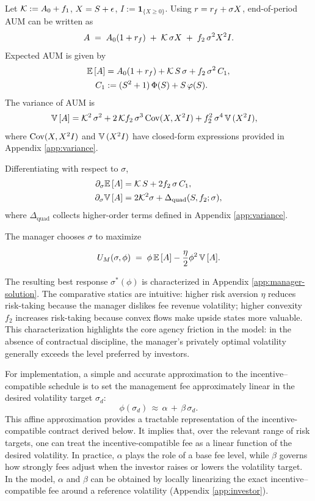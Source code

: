 Let \(\mathcal{K}:=A_0+f_1\), \(X=S+\epsilon\),
\(I:=\mathbf{1}_{\{X\ge 0\}}\). Using \(r=r_f+\sigma X\), end-of-period
AUM can be written as \begin{equation}
A \;=\; A_0(1+r_f) \;+\; \mathcal{K}\,\sigma X \;+\; f_2\,\sigma^2 X^2 I.
\end{equation} Expected AUM is given by \begin{align}
{\mathbb{E}}\,[A] &= A_0(1+r_f) + \mathcal{K}\,S\,\sigma + f_2\,\sigma^2\,C_1, \label{eq:EA}\\
C_1 &:= (S^2+1)\,\Phi(S) + S\,\varphi(S). \label{eq:C1}
\end{align} The variance of AUM is \begin{align}
{\mathbb{V}}\,[A] &= \mathcal{K}^2\,\sigma^2 + 2\,\mathcal{K} f_2\,\sigma^3\,{\mathrm{Cov}}(X, X^2 I) + f_2^2\,\sigma^4\,{\mathbb{V}}\,(X^2 I), \label{eq:VarA}
\end{align} where \({\mathrm{Cov}}(X, X^2 I)\) and \({\mathbb{V}}\,(X^2 I)\) have closed-form
expressions provided in Appendix \ref{app:variance}.

Differentiating with respect to \(\sigma\), \begin{align}
\partial_\sigma {\mathbb{E}}\,[A] &= \mathcal{K}\,S + 2 f_2\,\sigma\,C_1, \label{eq:dEA}\\
\partial_\sigma {\mathbb{V}}\,[A] &= 2\mathcal{K}^2\sigma + \Delta_{\text{quad}}(S,f_2;\sigma), \label{eq:dVarA}
\end{align} where \(\Delta_{\text{quad}}\) collects higher-order terms
defined in Appendix \ref{app:variance}.

The manager chooses \(\sigma\) to maximize

\[
U_M(\sigma,\phi)\;=\;\phi\,{\mathbb{E}}\,[A] - \frac{\eta}{2}\phi^2\,{\mathbb{V}}\,[A].
\]

The resulting best response \(\sigma^*(\phi)\) is characterized in
Appendix \ref{app:manager-solution}. The comparative statics are
intuitive: higher risk aversion \(\eta\) reduces risk-taking because the
manager dislikes fee revenue volatility; higher convexity \(f_2\)
increases risk-taking because convex flows make upside states more
valuable. This characterization highlights the core agency friction in
the model: in the absence of contractual discipline, the manager's
privately optimal volatility generally exceeds the level preferred by
investors.

For implementation, a simple and accurate approximation to the
incentive--compatible schedule is to set the management fee
approximately linear in the desired volatility target \(\sigma_d\):
\begin{equation}
\label{eq:phi-linear-approx}
\phi(\sigma_d) \,\approx\, \alpha \, + \, \beta\,\sigma_d.
\end{equation} This affine approximation provides a tractable
representation of the incentive-compatible contract derived below. It
implies that, over the relevant range of risk targets, one can treat the
incentive-compatible fee as a linear function of the desired volatility.
In practice, \(\alpha\) plays the role of a base fee level, while
\(\beta\) governs how strongly fees adjust when the investor raises or
lowers the volatility target. In the model, \(\alpha\) and \(\beta\) can
be obtained by locally linearizing the exact incentive--compatible fee
around a reference volatility (Appendix \ref{app:investor}).

